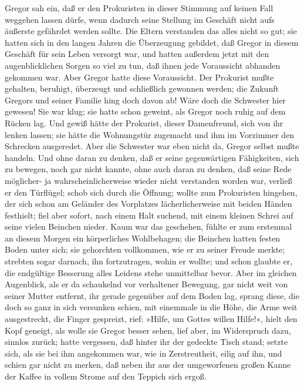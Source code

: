 Gregor sah ein, daß er den Prokuristen in dieser Stimmung auf keinen
Fall weggehen lassen dürfe, wenn dadurch seine Stellung im Geschäft
nicht aufs äußerste gefährdet werden sollte. Die Eltern verstanden das
alles nicht so gut; sie hatten sich in den langen Jahren die Überzeugung
gebildet, daß Gregor in diesem Geschäft für sein Leben versorgt war, und
hatten außerdem jetzt mit den augenblicklichen Sorgen so viel zu tun,
daß ihnen jede Voraussicht abhanden gekommen war. Aber Gregor hatte
diese Voraussicht. Der Prokurist mußte gehalten, beruhigt, überzeugt und
schließlich gewonnen werden; die Zukunft Gregors und seiner Familie hing
doch davon ab! Wäre doch die Schwester hier gewesen! Sie war klug; sie
hatte schon geweint, als Gregor noch ruhig auf dem Rücken lag. Und gewiß
hätte der Prokurist, dieser Damenfreund, sich von ihr lenken lassen;
sie hätte die Wohnungstür zugemacht und ihm im Vorzimmer den Schrecken
ausgeredet. Aber die Schwester war eben nicht da, Gregor selbst mußte
handeln. Und ohne daran zu denken, daß er seine gegenwärtigen
Fähigkeiten, sich zu bewegen, noch gar nicht kannte, ohne auch daran zu
denken, daß seine Rede möglicher- ja wahrscheinlicherweise wieder nicht
verstanden worden war, verließ er den Türflügel; schob sich durch die
Öffnung; wollte zum Prokuristen hingehen, der sich schon am Geländer des
Vorplatzes lächerlicherweise mit beiden Händen festhielt; fiel aber
sofort, nach einem Halt suchend, mit einem kleinen Schrei auf seine
vielen Beinchen nieder. Kaum war das geschehen, fühlte er zum erstenmal
an diesem Morgen ein körperliches Wohlbehagen; die Beinchen hatten
festen Boden unter sich; sie gehorchten vollkommen, wie er zu seiner
Freude merkte; strebten sogar darnach, ihn fortzutragen, wohin er
wollte; und schon glaubte er, die endgültige Besserung alles Leidens
stehe unmittelbar bevor. Aber im gleichen Augenblick, als er da
schaukelnd vor verhaltener Bewegung, gar nicht weit von seiner Mutter
entfernt, ihr gerade gegenüber auf dem Boden lag, sprang diese, die doch
so ganz in sich versunken schien, mit einemmale in die Höhe, die Arme
weit ausgestreckt, die Finger gespreizt, rief: »Hilfe, um Gottes willen
Hilfe!«, hielt den Kopf geneigt, als wolle sie Gregor besser sehen, lief
aber, im Widerspruch dazu, sinnlos zurück; hatte vergessen, daß hinter
ihr der gedeckte Tisch stand; setzte sich, als sie bei ihm angekommen
war, wie in Zerstreutheit, eilig auf ihn, und schien gar nicht zu
merken, daß neben ihr aus der umgeworfenen großen Kanne der Kaffee in
vollem Strome auf den Teppich sich ergoß.


